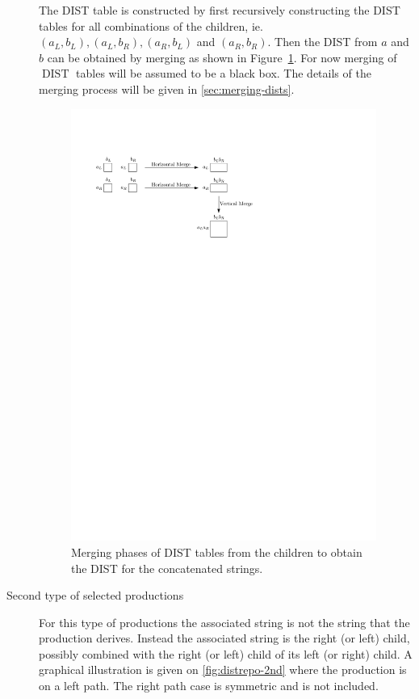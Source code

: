 \documentclass[twoside,11pt,openright]{report}
\newcommand{\DIST}{\operatorname{DIST}}
\begin{document}
\begin{description}
  The DIST table is constructed by first recursively constructing the DIST tables for all combinations of the children, ie. $(a_L, b_L), (a_L, b_R), (a_R, b_L)$ and $(a_R, b_R)$. Then the DIST from $a$ and $b$ can be obtained by merging as shown in Figure~\ref{fig:compression:dist:merge}. For now merging of $\DIST$ tables will be assumed to be a black box. The details of the merging process will be given in \cref{sec:merging-dists}.
  \begin{figure}[h!]
    \centering
    \includegraphics[width=10cm]{images/dist_merge}
    \caption{Merging phases of DIST tables from the children to obtain the DIST for the concatenated strings.}
    \label{fig:compression:dist:merge}
  \end{figure}

  \item[Second type of selected productions] For this type of productions the associated string is not the string that the production derives. Instead the associated string is the right (or left) child, possibly combined with the right (or left) child of its left (or right) child. A graphical illustration is given on \cref{fig:distrepo-2nd} where the production is on a left path. The right path case is symmetric and is not included.


\end{description}
\end{document}
